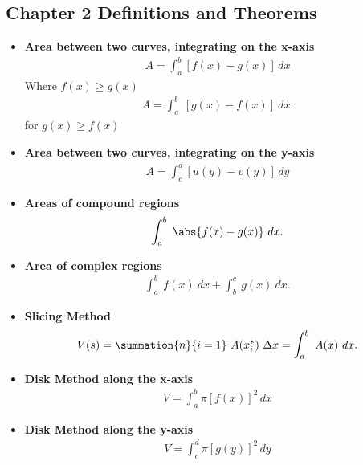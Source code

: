 \documentclass{report}
\begin{document}
    \pagebreak \bigbreak \noindent 
    \subsection{Chapter 2 Definitions and Theorems}
    \bigbreak \noindent 
    \begin{itemize}

        \item \textbf{Area between two curves, integrating on the x-axis}
            \begin{align}
                A = \int_{a}^{b} [f(x) - g(x)] \, dx
            \end{align}
            Where $f(x) \geq g(x)$
            \begin{align*}
                A = \int_{a}^{b}\ [g(x) - f(x)]\ dx
            .\end{align*}
            for $g(x) \geq f(x)$

        \item \textbf{Area between two curves, integrating on the y-axis}
            \begin{align}
                A = \int_{c}^{d} [u(y) - v(y)] \, dy
            \end{align}

        \item \textbf{Areas of compound regions}
            \begin{align*}
                \int_{a}^{b}\ \abs{f(x)-g(x)}\ dx 
            .\end{align*}
        \item \textbf{Area of complex regions}
            \begin{align*}
                \int_{a}^{b}\ f(x)\ dx + \int_{b}^{c}\ g(x)\ dx
            .\end{align*}
        \item \textbf{Slicing Method}
            \begin{align*}
                V(s) = \summation{n}{i=1}\ A(x_{i}^{*})\ \Delta x  = \int_{a}^{b}\ A(x)\ dx
            .\end{align*}
        \item \textbf{Disk Method along the x-axis}
            \begin{align}
                V = \int_{a}^{b} \pi [f(x)]^2 \, dx
            \end{align}

        \item \textbf{Disk Method along the y-axis}
            \begin{align}
                V = \int_{c}^{d} \pi [g(y)]^2 \, dy
            \end{align}


\end{itemize}
\end{document}
